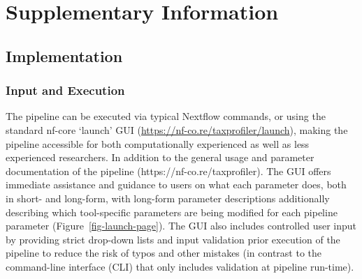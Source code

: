 \documentclass[
]{article}
\begin{document}
\hypertarget{supplementary-information}{%
\section{Supplementary Information}\label{supplementary-information}}

\hypertarget{implementation}{%
\subsection{Implementation}\label{implementation}}

\hypertarget{input-and-execution}{%
\subsubsection{Input and Execution}\label{input-and-execution}}

The pipeline can be executed via typical Nextflow commands, or using the
standard nf-core `launch' GUI
(\url{https://nf-co.re/taxprofiler/launch}), making the pipeline
accessible for both computationally experienced as well as less
experienced researchers. In addition to the general usage and parameter
documentation of the pipeline (https://nf-co.re/taxprofiler). The GUI
offers immediate assistance and guidance to users on what each parameter
does, both in short- and long-form, with long-form parameter
descriptions additionally describing which tool-specific parameters are
being modified for each pipeline parameter
(Figure~\ref{fig-launch-page}). The GUI also includes controlled user
input by providing strict drop-down lists and input validation prior
execution of the pipeline to reduce the risk of typos and other mistakes
(in contrast to the command-line interface (CLI) that only includes
validation at pipeline run-time).
\end{document}
